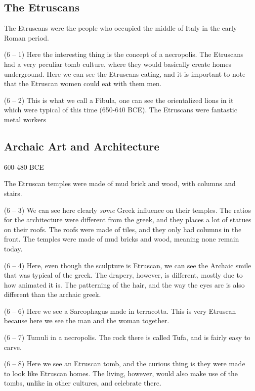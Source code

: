 \documentclass{article}
\begin{document}
    \begin{spacing}{1.2}
    \newpage
        \section{The Etruscans}
        The Etruscans were the people who occupied the middle of Italy in the early Roman period.

        (6 -- 1) Here the interesting thing is the concept of a necropolis. The Etruscans had a very peculiar tomb culture, where they would basically create homes underground. Here we can see the Etruscans eating, and it is important to note that the Etruscan women could eat with them men.

        (6 -- 2) This is what we call a Fibula, one can see the orientalized lions in it which were typical of this time (650-640 BCE). The Etruscans were fantastic metal workers

        \subsection{Archaic Art and Architecture}
        \begin{flushright}
            600-480 BCE
        \end{flushright}
        The Etruscan temples were made of mud brick and wood, with columns and stairs. 

        (6 -- 3) We can see here clearly \emph{some} Greek influence on their temples. The ratios for the architecture were different from the greek, and they places a lot of statues on their roofs. The roofs were made of tiles, and they only had columns in the front. The temples were made of mud bricks and wood, meaning none remain today. 

        (6 -- 4) Here, even though the sculpture is Etruscan, we can see the Archaic smile that was typical of the greek. The drapery, however, is different, mostly due to how animated it is. The patterning of the hair,
        and the way the eyes are is also different than the archaic greek.

        (6 -- 6) Here we see a Sarcophagus made in terracotta. This is very Etruscan because here we see the man and the woman together. 

        (6 -- 7) Tumuli in a necropolis. The rock there is called Tufa, and is fairly easy to carve.
        
        (6 -- 8) Here we see an Etruscan tomb, and the curious thing is they were made to look like Etruscan homes. The living, however, would also make use of the tombs, unlike in other cultures, and celebrate there.


\end{spacing}
\end{document}
